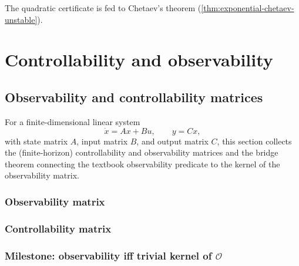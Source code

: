 The quadratic certificate is fed to Chetaev's theorem (\cref{thm:exponential-chetaev-unstable}).



\chapter{Controllability and observability}

\section{Observability and controllability matrices}

For a finite-dimensional linear system
\[
  \dot{x} = A x + B u, \qquad y = C x,
\]
with state matrix $A$, input matrix $B$, and output matrix $C$, this section
collects the (finite-horizon) controllability and observability matrices and
the bridge theorem connecting the textbook observability predicate to the
kernel of the observability matrix.

\subsection{Observability matrix}





\subsection{Controllability matrix}




\subsection{Milestone: observability iff trivial kernel of \texorpdfstring{$\mathcal{O}$}{O}}


